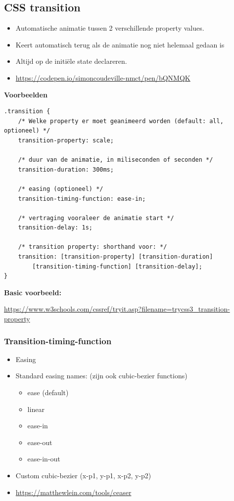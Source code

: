 \documentclass{article}
\newcommand{\bold}[1]{\textbf{#1}}
\begin{document}
\subsection{CSS transition}
\begin{itemize}
    \item Automatische animatie tussen 2 verschillende property values.
    \item Keert automatisch terug als de animatie nog niet helemaal gedaan is
    \item Altijd op de initiële state declareren.
    \item \url{https://codepen.io/simoncoudeville-nmct/pen/bQNMQK}
\end{itemize}

\bold{Voorbeelden}

\begin{verbatim}
.transition {
    /* Welke property er moet geanimeerd worden (default: all, optioneel) */
    transition-property: scale;

    /* duur van de animatie, in miliseconden of seconden */
    transition-duration: 300ms;

    /* easing (optioneel) */
    transition-timing-function: ease-in;

    /* vertraging vooraleer de animatie start */
    transition-delay: 1s;

    /* transition property: shorthand voor: */
    transition: [transition-property] [transition-duration] 
        [transition-timing-function] [transition-delay];
}
\end{verbatim}

\bold{Basic voorbeeld:}

\url{https://www.w3schools.com/cssref/tryit.asp?filename=trycss3_transition-property}

\subsubsection{Transition-timing-function}

\begin{itemize}
    \item Easing
    \item Standard easing names: (zijn ook cubic-bezier functions)
    \begin{itemize}
        \item ease (default)
        \item linear
        \item ease-in
        \item ease-out
        \item ease-in-out
    \end{itemize}
    \item Custom cubic-bezier (x-p1, y-p1, x-p2, y-p2)
    \item \url{https://matthewlein.com/tools/ceaser}
\end{itemize}
\end{document}
